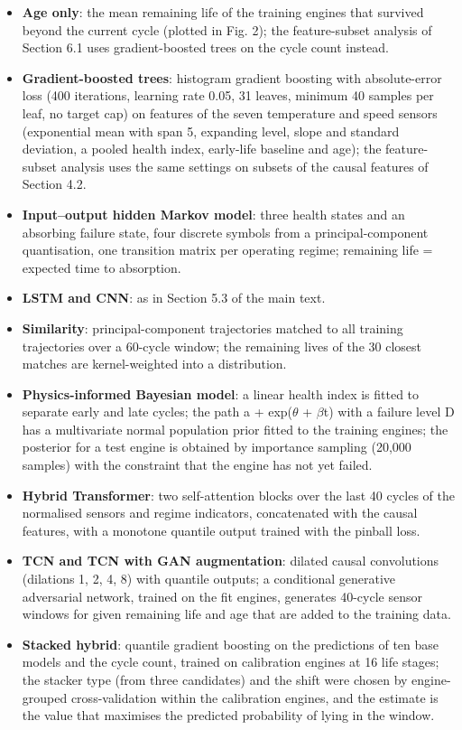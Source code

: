 \documentclass[11pt,a4paper]{article}
\begin{document}
\begin{itemize}[leftmargin=1.2em,itemsep=2pt]
\item \textbf{Age only}: the mean remaining life of the training engines that survived beyond the current cycle (plotted in Fig. 2); the feature-subset analysis of Section 6.1 uses gradient-boosted trees on the cycle count instead.
\item \textbf{Gradient-boosted trees}: histogram gradient boosting with absolute-error loss (400 iterations, learning rate 0.05, 31 leaves, minimum 40 samples per leaf, no target cap) on features of the seven temperature and speed sensors (exponential mean with span 5, expanding level, slope and standard deviation, a pooled health index, early-life baseline and age); the feature-subset analysis uses the same settings on subsets of the causal features of Section 4.2.
\item \textbf{Input--output hidden Markov model}: three health states and an absorbing failure state, four discrete symbols from a principal-component quantisation, one transition matrix per operating regime; remaining life = expected time to absorption.
\item \textbf{LSTM and CNN}: as in Section 5.3 of the main text.
\item \textbf{Similarity}: principal-component trajectories matched to all training trajectories over a 60-cycle window; the remaining lives of the 30 closest matches are kernel-weighted into a distribution.
\item \textbf{Physics-informed Bayesian model}: a linear health index is fitted to separate early and late cycles; the path a + exp($\theta$ + $\beta$t) with a failure level D has a multivariate normal population prior fitted to the training engines; the posterior for a test engine is obtained by importance sampling (20,000 samples) with the constraint that the engine has not yet failed.
\item \textbf{Hybrid Transformer}: two self-attention blocks over the last 40 cycles of the normalised sensors and regime indicators, concatenated with the causal features, with a monotone quantile output trained with the pinball loss.
\item \textbf{TCN and TCN with GAN augmentation}: dilated causal convolutions (dilations 1, 2, 4, 8) with quantile outputs; a conditional generative adversarial network, trained on the fit engines, generates 40-cycle sensor windows for given remaining life and age that are added to the training data.
\item \textbf{Stacked hybrid}: quantile gradient boosting on the predictions of ten base models and the cycle count, trained on calibration engines at 16 life stages; the stacker type (from three candidates) and the shift were chosen by engine-grouped cross-validation within the calibration engines, and the estimate is the value that maximises the predicted probability of lying in the window.
\end{itemize}
\end{document}
